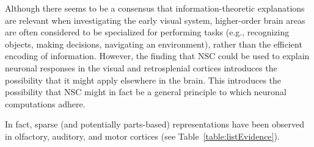 Although there seems to be a consensus that 
information-theoretic explanations are relevant 
when investigating the early visual system,
higher-order brain areas are often considered to be specialized for
performing tasks
(e.g., recognizing objects, making decisions, navigating an environment),
rather than the efficient encoding of information.
However, the finding that \ac{NSC} could be used to explain neuronal responses
in the visual and retrosplenial cortices introduces the possibility that it might
apply elsewhere in the brain.
This introduces the possibility that \ac{NSC} might in fact
be a general principle to which neuronal computations adhere.

In fact, sparse (and potentially parts-based) representations have been observed
in olfactory, auditory,  and motor cortices
(see Table~\ref{table:listEvidence}).


